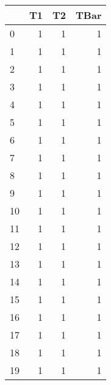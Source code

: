 \begin{tabular}{lrrr}
\toprule
 & T1 & T2 & TBar \\
\midrule
0 & 1 & 1 & 1 \\
1 & 1 & 1 & 1 \\
2 & 1 & 1 & 1 \\
3 & 1 & 1 & 1 \\
4 & 1 & 1 & 1 \\
5 & 1 & 1 & 1 \\
6 & 1 & 1 & 1 \\
7 & 1 & 1 & 1 \\
8 & 1 & 1 & 1 \\
9 & 1 & 1 & 1 \\
10 & 1 & 1 & 1 \\
11 & 1 & 1 & 1 \\
12 & 1 & 1 & 1 \\
13 & 1 & 1 & 1 \\
14 & 1 & 1 & 1 \\
15 & 1 & 1 & 1 \\
16 & 1 & 1 & 1 \\
17 & 1 & 1 & 1 \\
18 & 1 & 1 & 1 \\
19 & 1 & 1 & 1 \\
\bottomrule
\end{tabular}
